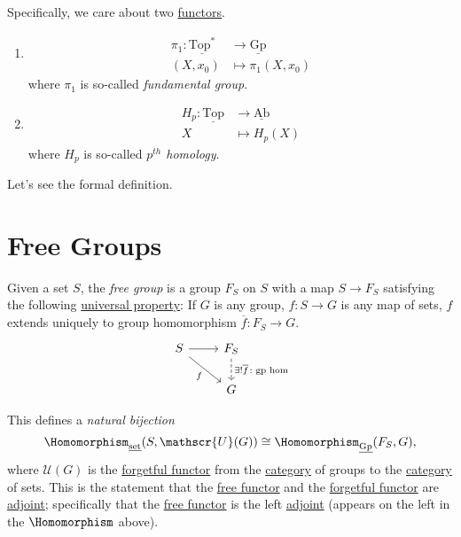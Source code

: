 \begin{remark}
	Specifically, we care about two \hyperref[def:functor]{functors}.
	\begin{enumerate}
		\item
		      \[
			      \begin{split}
				      \pi _1\colon \underline{\mathrm{Top}^*} &\to \underline{\mathrm{Gp}} \\
				      (X, x_0)&\mapsto \pi_1(X, x_0)
			      \end{split}
		      \]
		      where \(\pi _1\) is so-called \emph{fundamental group}.
		\item
		      \[
			      \begin{split}
				      H_p\colon \underline{\mathrm{Top}} &\to \underline{\mathrm{Ab}} \\
				      X&\mapsto H_{p} (X)
			      \end{split}
		      \]
		      where \(H_{p}\) is so-called \emph{\(p^{th}\) homology}.
	\end{enumerate}
\end{remark}

Let's see the formal definition.

\section{Free Groups}
\begin{definition}\label{def:free-group}
	Given a set \(S\), the \emph{free group} is a group \(F_S\) on \(S\) with a map \(S\to F_S\) satisfying the following
	\underline{universal property}: If \(G\) is any group, \(f\colon S\to G\) is any map of sets, \(f\) extends uniquely
	to group homomorphism \(\overline{f} \colon F_S \to G\).
	\[
		\begin{tikzcd}
			S \ar[rd, "f"']\ar[r, ] & F_S\ar[d, dashed, "\exists ! \overline{f} \colon \text{gp hom} "]\\
			& G
		\end{tikzcd}
	\]
\end{definition}
\begin{note}
	This defines a \emph{natural bijection}
	\[
		\Homomorphism_{\underline{\mathrm{set}}}(S, \mathscr{U}(G))\cong \Homomorphism_{\underline{\mathrm{Gp}}}(F_S, G),
	\]
	where \(\mathscr{U} (G)\) is the \hyperref[eg:forgetful-functor]{forgetful functor} from the
	\hyperref[def:category]{category} of groups to the \hyperref[def:category]{category} of sets. This is the
	statement that the \hyperref[eg:free-functor]{free functor} and the \hyperref[eg:forgetful-functor]{forgetful functor} are \hyperref[def:adjoint-functor]{adjoint};
	specifically that the \hyperref[eg:free-functor]{free functor} is the left \hyperref[def:adjoint-functor]{adjoint} (appears on the left in the \(\Homomorphism\) above).
\end{note}

